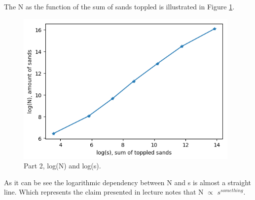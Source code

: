 \documentclass{article}
\begin{document}
The N as the function of the sum of sands toppled is illustrated in Figure \ref{fig:part2sa}.

\begin{figure}[!hbt]
	\centering
	\includegraphics[width=4.3in]{part2sa}
	\caption{Part 2, log(N) and log(s).}
	\label{fig:part2sa}
\end{figure}

As it can be see the logarithmic dependency between N and s is almost a straight line. Which represents the claim presented in lecture notes that N $\propto$ $s^{something}$.
\end{document}
